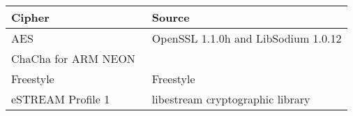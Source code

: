 \begin{table}[t]
    \begin{center}
        \small
        \centering
        \begin{tabular}{l|l}
            \hline
            {\bf Cipher} & {\bf Source} \\
            \hline
            AES & OpenSSL 1.1.0h \cite{x} and LibSodium 1.0.12 \cite{x} \\
            ChaCha for ARM NEON~\cite{Floodyberry} \\
            Freestyle & Freestyle~\cite{Freestyle} \\
            eSTREAM Profile 1 & libestream cryptographic library~\cite{libestream} \\
        \end{tabular}
    \end{center}

\end{table}

